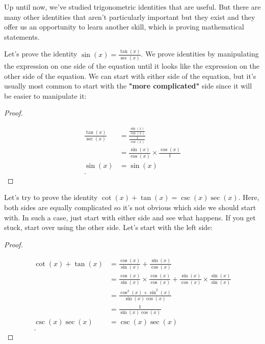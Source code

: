 
Up until now, we've studied trigonometric identities that are useful. But there
are many other identities that aren't particularly important but they exist and
they offer us an opportunity to learn another skill, which is proving
mathematical statements.

Let's prove the identity $\sin (x) = \frac{\tan (x)}{\sec (x)}$. We prove
identities by manipulating the expression on one side of the equation until it
looks like the expression on the other side of the equation. We can start with
either side of the equation, but it's usually most common to start with the
\textbf{"more complicated"} side since it will be easier to manipulate it:

\begin{proof}
  \label{prf:sin_equals_tan_sec}

  \begin{align*}
    \frac{\tan (x)}{\sec (x)} &= \frac{\frac{\sin (x)}{\cos (x)}}{\frac{1}{\cos (x)}} \\
                              &= \frac{\sin (x)}{\cos (x)} \times \frac{\cos (x)}{1} \\
                     \sin (x) &= \sin (x) \\
  .\end{align*}
\end{proof}

Let's try to prove the identity $\cot (x) + \tan (x) = \csc (x) \sec(x)$. Here,
both sides are equally complicated so it's not obvious which side we should
start with. In such a case, just start with either side and see what happens.
If you get stuck, start over using the other side. Let's start with the left
side:

\begin{proof}
  \label{prf:cot_tan_equal_csc_sec}

  \begin{align*}
    \cot (x) + \tan (x) &= \frac{\cos (x)}{\sin (x)} + \frac{\sin (x)}{\cos (x)} \\
                        &= \frac{\cos (x)}{\sin (x)} \times \frac{\cos (x)}{\cos (x)} + \frac{\sin (x)}{\cos (x)} \times \frac{\sin (x)}{\sin (x)} \\
                        &= \frac{\cos^{2} (x) + \sin^{2} (x)}{\sin (x)\cos (x)} \\
                        &= \frac{1}{\sin (x)\cos (x)} \\
       \csc (x)\sec (x) &= \csc (x)\sec (x) \\
  .\end{align*}
\end{proof}

